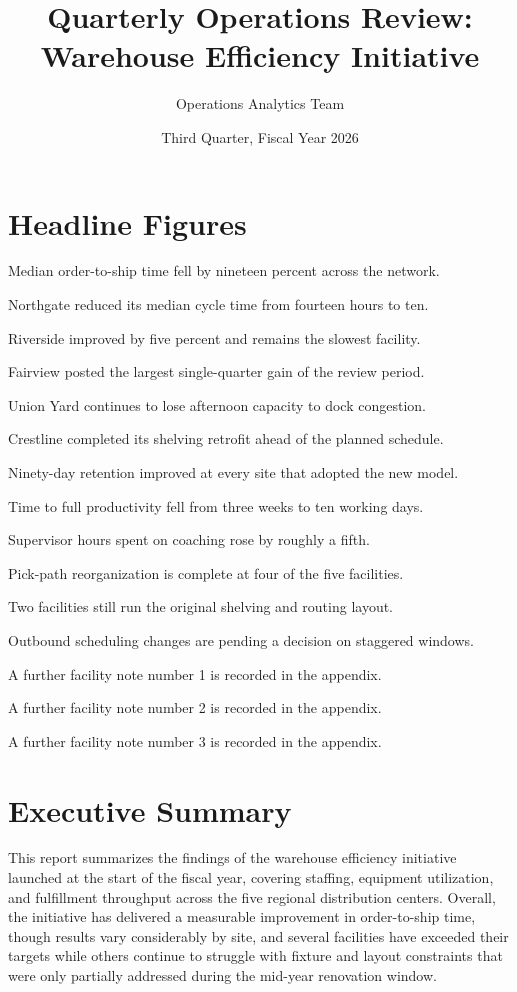 \documentclass[11pt]{article}
\title{Quarterly Operations Review: Warehouse Efficiency Initiative}
\author{Operations Analytics Team}
\date{Third Quarter, Fiscal Year 2026}
\begin{document}
\maketitle

\section{Headline Figures}

Median order-to-ship time fell by nineteen percent across the network.

Northgate reduced its median cycle time from fourteen hours to ten.

Riverside improved by five percent and remains the slowest facility.

Fairview posted the largest single-quarter gain of the review period.

Union Yard continues to lose afternoon capacity to dock congestion.

Crestline completed its shelving retrofit ahead of the planned schedule.

Ninety-day retention improved at every site that adopted the new model.

Time to full productivity fell from three weeks to ten working days.

Supervisor hours spent on coaching rose by roughly a fifth.

Pick-path reorganization is complete at four of the five facilities.

Two facilities still run the original shelving and routing layout.

Outbound scheduling changes are pending a decision on staggered windows.

A further facility note number 1 is recorded in the appendix.

A further facility note number 2 is recorded in the appendix.

A further facility note number 3 is recorded in the appendix.

\section{Executive Summary}
This report summarizes the findings of the warehouse efficiency initiative
launched at the start of the fiscal year, covering staffing, equipment
utilization, and fulfillment throughput across the five regional
distribution centers. Overall, the initiative has delivered a measurable
improvement in order-to-ship time, though results vary considerably by
site, and several facilities have exceeded their targets while others
continue to struggle with fixture and layout constraints that were only
partially addressed during the mid-year renovation window.
\end{document}
